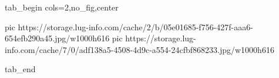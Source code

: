  
 
 
 
 


\ifcmt
  tab_begin cols=2,no_fig,center

     pic https://storage.lug-info.com/cache/2/b/05e01685-f756-427f-aaa6-654efb290a45.jpg/w1000h616%
     pic https://storage.lug-info.com/cache/7/0/adf138a5-4508-4d9c-a554-24cfbf868233.jpg/w1000h616%

  tab_end
\fi

